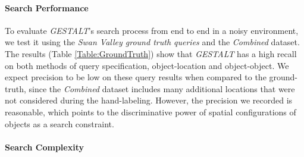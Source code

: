 \paragraph{Search Performance}
To evaluate \emph{GESTALT}'s search process from end to end in a noisy environment, we test it using the \textit{Swan Valley ground truth queries} and the \textit{Combined} dataset.
The results (Table \ref{Table:GroundTruth}) show that \emph{GESTALT} has a high recall on both methods of query specification, object-location and object-object.
We expect precision to be low on these query results when compared to the ground-truth, since the \textit{Combined} dataset includes many additional locations that were not considered during the hand-labeling.
However, the precision we recorded is reasonable, which points to the discriminative power of spatial configurations of objects as a search constraint.


\paragraph{Search Complexity}

